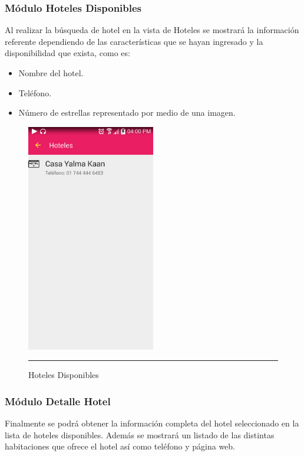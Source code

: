 \subsubsection{Módulo Hoteles Disponibles}
Al realizar la búsqueda de hotel en la vista de Hoteles se mostrará la información 
referente dependiendo de las características que se hayan ingresado y la disponibilidad que exista, como es:
\begin{itemize}
\item Nombre del hotel.
\item Teléfono.
\item Número de estrellas representado por medio de una imagen.
\end{itemize}
\begin{figure}[h]
	\centering
		\includegraphics[width=0.5\textwidth]{Figuras/hdisponible.png}
		\rule{30em}{0.5pt}
	\caption[Hoteles Disponibles]{Hoteles Disponibles}
	\label{fig:hotelesDisponibles}
\end{figure}

\clearpage

\subsubsection{Módulo Detalle Hotel}
Finalmente se podrá obtener la información completa del hotel seleccionado en la lista de hoteles disponibles. Además se mostrará un 
listado de las distintas habitaciones que ofrece el hotel así como teléfono y página web.

